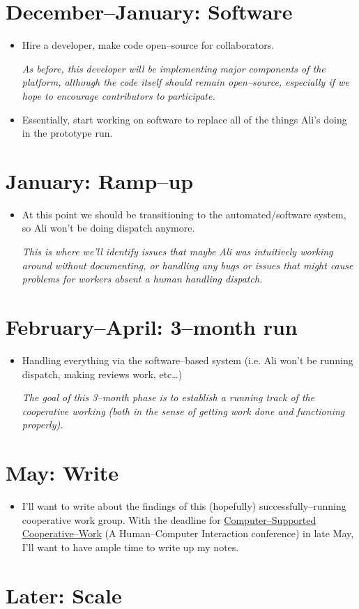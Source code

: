 \documentclass[11pt]{article}
\begin{document}
\section*{December--January: Software}
  \begin{itemize}
    \item Hire a developer, make code open--source for collaborators.

    \textit{As before, this developer will be implementing major components of the platform, although the code itself should remain open--source, especially if we hope to encourage contributors to participate.}
    \item Essentially, start working on software to replace all of the things Ali's doing in the prototype run.
  \end{itemize}
\section*{January: Ramp--up}
  \begin{itemize}
    \item At this point we should be transitioning to the automated/software system,
    so Ali won't be doing dispatch anymore.
    
    \textit{
      This is where we'll identify issues that maybe Ali was intuitively working around without documenting,
      or handling any bugs or issues that might cause problems for workers absent a human handling dispatch.}
  \end{itemize}
\section*{February--April: 3--month run}
  \begin{itemize}
    \item Handling everything via the software--based system (i.e. Ali won't be running dispatch, making reviews work, etc\dots)

    \textit{The goal of this 3--month phase is to establish a running track of the cooperative working (both in the sense of getting work done and functioning properly).}
  \end{itemize}
\section*{May: Write}
  \begin{itemize}
    \item I'll want to write about the findings of this
    (hopefully) successfully--running cooperative work group.
    With the deadline for \href{http://cscw.acm.org/2016/index.php}{Computer--Supported Cooperative--Work}
    (A Human--Computer Interaction conference) in late May,
    I'll want to have ample time to write up my notes.
  \end{itemize}
\section*{Later: Scale}

% 
% 
\end{document}
